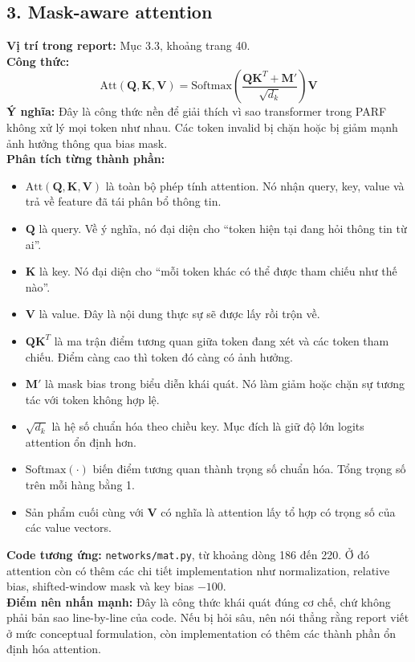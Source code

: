 \documentclass[12pt,a4paper]{article}
\begin{document}
\subsection*{3. Mask-aware attention}
\textbf{Vị trí trong report:} Mục 3.3, khoảng trang 40.\\
\textbf{Công thức:}
\[
\mathrm{Att}(\mathbf{Q}, \mathbf{K}, \mathbf{V}) =
\mathrm{Softmax}\left(\frac{\mathbf{Q}\mathbf{K}^T + \mathbf{M}'}{\sqrt{d_k}}\right)\mathbf{V}
\]
\textbf{Ý nghĩa:} Đây là công thức nền để giải thích vì sao transformer trong PARF không xử lý mọi token như nhau. Các token invalid bị chặn hoặc bị giảm mạnh ảnh hưởng thông qua bias mask.\\
\textbf{Phân tích từng thành phần:}
\begin{itemize}[leftmargin=1.5em]
\item $\mathrm{Att}(\mathbf{Q},\mathbf{K},\mathbf{V})$ là toàn bộ phép tính attention. Nó nhận query, key, value và trả về feature đã tái phân bổ thông tin.
\item $\mathbf{Q}$ là query. Về ý nghĩa, nó đại diện cho ``token hiện tại đang hỏi thông tin từ ai''.
\item $\mathbf{K}$ là key. Nó đại diện cho ``mỗi token khác có thể được tham chiếu như thế nào''.
\item $\mathbf{V}$ là value. Đây là nội dung thực sự sẽ được lấy rồi trộn về.
\item $\mathbf{Q}\mathbf{K}^{T}$ là ma trận điểm tương quan giữa token đang xét và các token tham chiếu. Điểm càng cao thì token đó càng có ảnh hưởng.
\item $\mathbf{M}'$ là mask bias trong biểu diễn khái quát. Nó làm giảm hoặc chặn sự tương tác với token không hợp lệ.
\item $\sqrt{d_k}$ là hệ số chuẩn hóa theo chiều key. Mục đích là giữ độ lớn logits attention ổn định hơn.
\item $\mathrm{Softmax}(\cdot)$ biến điểm tương quan thành trọng số chuẩn hóa. Tổng trọng số trên mỗi hàng bằng 1.
\item Sản phẩm cuối cùng với $\mathbf{V}$ có nghĩa là attention lấy tổ hợp có trọng số của các value vectors.
\end{itemize}
\textbf{Code tương ứng:} \texttt{networks/mat.py}, từ khoảng dòng 186 đến 220. Ở đó attention còn có thêm các chi tiết implementation như normalization, relative bias, shifted-window mask và key bias $-100$.\\
\textbf{Điểm nên nhấn mạnh:} Đây là công thức khái quát đúng cơ chế, chứ không phải bản sao line-by-line của code. Nếu bị hỏi sâu, nên nói thẳng rằng report viết ở mức conceptual formulation, còn implementation có thêm các thành phần ổn định hóa attention.
\end{document}
